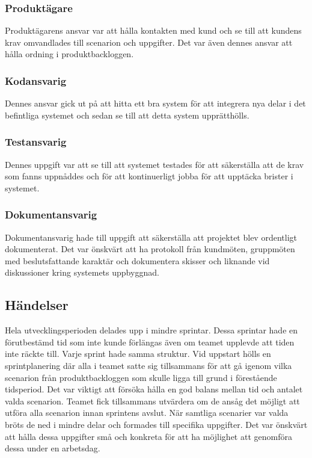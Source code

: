 \subsubsection{Produktägare}
Produktägarens ansvar var att hålla kontakten med kund och se till att kundens krav omvandlades till scenarion och uppgifter. Det var även dennes ansvar att hålla ordning i produktbackloggen.

\subsubsection{Kodansvarig}
Dennes ansvar gick ut på att hitta ett bra system för att integrera nya delar i det befintliga systemet och sedan se till att detta system upprätthölls. 

\subsubsection{Testansvarig}
Dennes uppgift var att se till att systemet testades för att säkerställa att de krav som fanns uppnåddes och för att kontinuerligt jobba för att upptäcka brister i systemet.

\subsubsection{Dokumentansvarig}
Dokumentansvarig hade till uppgift att säkerställa att projektet blev ordentligt dokumenterat. Det var önskvärt att ha protokoll från kundmöten, gruppmöten med beslutsfattande karaktär och dokumentera skisser och liknande vid diskussioner kring systemets uppbyggnad.

\subsection{Händelser}
Hela utvecklingsperioden delades upp i mindre sprintar. Dessa sprintar hade en förutbestämd tid som inte kunde förlängas även om teamet upplevde att tiden inte räckte till. Varje sprint hade samma struktur. Vid uppstart hölls en sprintplanering där alla i teamet satte sig tillsammans för att gå igenom vilka scenarion från produktbackloggen som skulle ligga till grund i förestående tidsperiod. Det var viktigt att försöka hålla en god balans mellan tid och antalet valda scenarion. Teamet fick tillsammans utvärdera om de ansåg det möjligt att utföra alla scenarion innan sprintens avslut. När samtliga scenarier var valda bröts de ned i mindre delar och formades till specifika uppgifter. Det var önskvärt att hålla dessa uppgifter små och konkreta för att ha möjlighet att genomföra dessa under en arbetsdag. 

